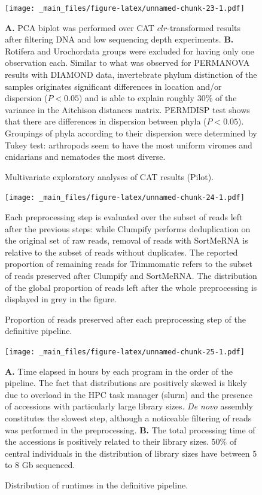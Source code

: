 \documentclass[
  openany]{book}
\begin{document}
\begin{figure}[!htbp]

\texttt{[image: \_main\_files/figure-latex/unnamed-chunk-23-1.pdf]}

\caption{Multivariate exploratory analyses of CAT results (Pilot).\label{fig:sample50pcacat}}
\textbf{A.} PCA biplot was performed over CAT $clr$-transformed results after filtering DNA and low sequencing depth experiments. \textbf{B.} Rotifera and Urochordata groups were excluded for having only one observation each. Similar to what was observed for PERMANOVA results with DIAMOND data, invertebrate phylum distinction of the samples originates significant differences in location and/or dispersion ($P < 0.05$) and is able to explain roughly $30\%$ of the variance in the Aitchison distances matrix. PERMDISP test shows that there are differences in dispersion between phyla ($P < 0.05$). Groupings of phyla according to their dispersion were determined by Tukey test: arthropods seem to have the most uniform viromes and cnidarians and nematodes the most diverse.
\end{figure}

\begin{figure}[!htbp]

\texttt{[image: \_main\_files/figure-latex/unnamed-chunk-24-1.pdf]}

\caption{Proportion of reads preserved after each preprocessing step of the definitive pipeline.\label{fig:preprocess}}
Each preprocessing step is evaluated over the subset of reads left after the previous steps: while Clumpify performs deduplication on the original set of raw reads, removal of reads with SortMeRNA is relative to the subset of reads without duplicates. The reported proportion of remaining reads for Trimmomatic refers to the subset of reads preserved after Clumpify and SortMeRNA. The distribution of the global proportion of reads left after the whole preprocessing is displayed in grey in the figure.
\end{figure}

\begin{figure}[!htbp]

\texttt{[image: \_main\_files/figure-latex/unnamed-chunk-25-1.pdf]}

\caption{Distribution of runtimes in the definitive pipeline.\label{fig:pipelinetimes}}
\textbf{A.} Time elapsed in hours by each program in the order of the pipeline. The fact that distributions are positively skewed is likely due to overload in the HPC task manager (slurm) and the presence of accessions with particularly large library sizes. \emph{De novo} assembly constitutes the slowest step, although a noticeable filtering of reads was performed in the preprocessing. \textbf{B.} The total processing time of the accessions is positively related to their library sizes. $50\%$ of central individuals in the distribution of library sizes have between 5 to 8 Gb sequenced.
\end{figure}
\end{document}
